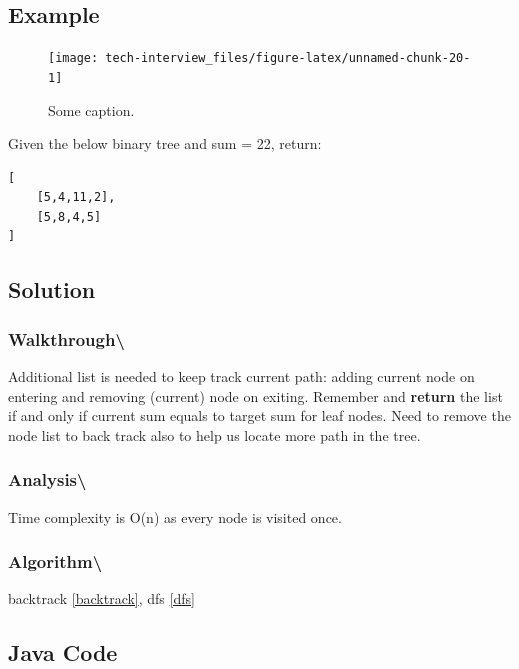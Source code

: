 \documentclass[]{book}
\begin{document}
\hypertarget{example-58}{%
\subsection{Example}\label{example-58}}

\begin{figure}
\texttt{[image: tech-interview\_files/figure-latex/unnamed-chunk-20-1]} \caption{Some caption.}\label{fig:unnamed-chunk-20}
\end{figure}

Given the below binary tree and sum = 22, return:

\begin{verbatim}
[
    [5,4,11,2],
    [5,8,4,5]
]
\end{verbatim}

\hypertarget{solution-42}{%
\subsection{Solution}\label{solution-42}}

\hypertarget{walkthrough-64}{%
\subsubsection{Walkthrough\textbackslash{}}\label{walkthrough-64}}

Additional list is needed to keep track current path: adding current node on entering and removing (current) node on
exiting. Remember and \textbf{return} the list if and only if current sum equals to target sum for leaf nodes.
Need to remove the node list to back track also to help us locate more path in the tree.

\hypertarget{analysis-71}{%
\subsubsection{Analysis\textbackslash{}}\label{analysis-71}}

Time complexity is O(n) as every node is visited once.

\hypertarget{algorithm-73}{%
\subsubsection{Algorithm\textbackslash{}}\label{algorithm-73}}

backtrack \ref{backtrack}, dfs \ref{dfs}

\hypertarget{java-code-46}{%
\subsection{Java Code}\label{java-code-46}}
\end{document}
